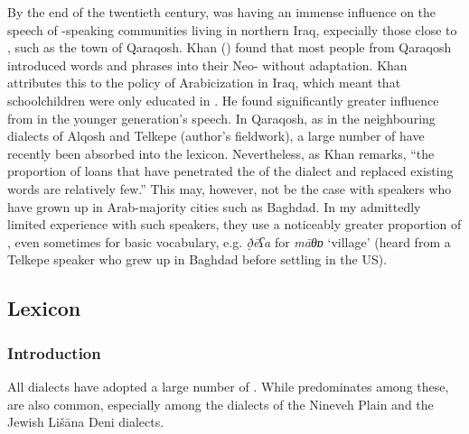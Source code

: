 \documentclass[output=paper]{langsci/langscibook}
\begin{document}
By the end of the twentieth century,  was having an immense influence on the speech of  -speaking communities living in northern Iraq, expecially those close to , such as the town of Qaraqosh. Khan (\citeyear[9]{Khan2002}) found that most people from Qaraqosh introduced  words and phrases into their Neo- without adaptation.  Khan attributes this to the policy of Arabicization in Iraq, which meant that schoolchildren were only educated in . He found significantly greater influence from  in the younger generation’s speech. In  Qaraqosh, as in the neighbouring dialects of  Alqosh and  Telkepe (author’s fieldwork), a large number of   have recently been absorbed into the lexicon. Nevertheless, as Khan remarks, “the proportion of  loans that have penetrated the  of the dialect and replaced existing  words are relatively few.” This may, however, not be the case with speakers who have grown up in Arab-majority cities such as Baghdad. In my admittedly limited experience with such speakers, they use a noticeably greater proportion of  , even sometimes for basic vocabulary, e.g.   \textit{ð̣ēʕa} for \textit{māθɒ} ‘village’ (heard from a  Telkepe speaker who grew up in Baghdad before settling in the US).

\subsection{Lexicon}
\subsubsection{\label{bkm:Ref13232790}Introduction}

All  dialects have adopted a large number of . While  predominates among these,   are also common, especially among the  dialects of the Nineveh Plain and the Jewish Lišāna Deni dialects.
\end{document}
